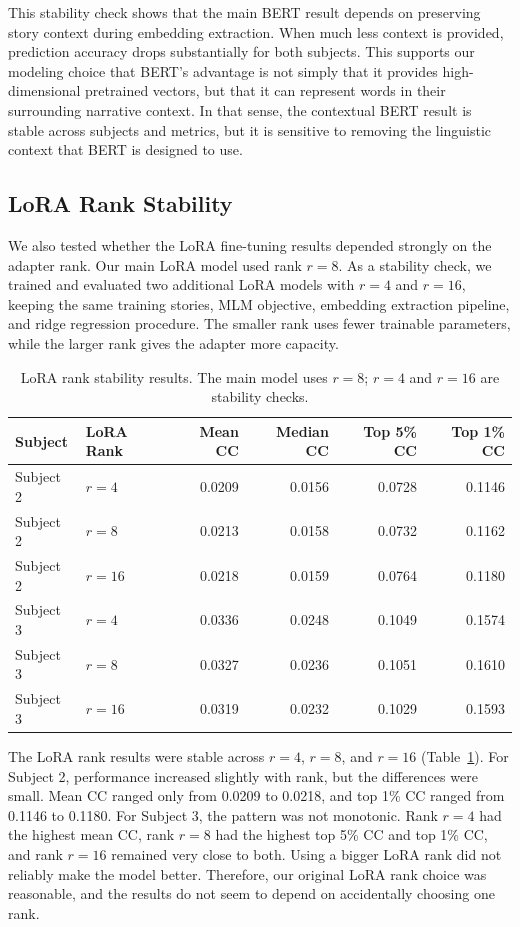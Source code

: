 \documentclass[11pt]{article}
\begin{document}
This stability check shows that the main BERT result depends on preserving story context during embedding extraction. When much less context is provided, prediction accuracy drops substantially for both subjects. This supports our modeling choice that BERT's advantage is not simply that it provides high-dimensional pretrained vectors, but that it can represent words in their surrounding narrative context. In that sense, the contextual BERT result is stable across subjects and metrics, but it is sensitive to removing the linguistic context that BERT is designed to use.

\subsection{LoRA Rank Stability}
\label{sec:stability-lora-rank}
We also tested whether the LoRA fine-tuning results depended strongly on the adapter rank. Our main LoRA model used rank \(r=8\). As a stability check, we trained and evaluated two additional LoRA models with \(r=4\) and \(r=16\), keeping the same training stories, MLM objective, embedding extraction pipeline, and ridge regression procedure. The smaller rank uses fewer trainable parameters, while the larger rank gives the adapter more capacity.

\begin{table}[H]
\centering
\begin{tabular}{llrrrr}
\toprule
Subject & LoRA Rank & Mean CC & Median CC & Top 5\% CC & Top 1\% CC \\
\midrule
Subject 2 & \(r=4\) & 0.0209 & 0.0156 & 0.0728 & 0.1146 \\
Subject 2 & \(r=8\) & 0.0213 & 0.0158 & 0.0732 & 0.1162 \\
Subject 2 & \(r=16\) & 0.0218 & 0.0159 & 0.0764 & 0.1180 \\
\midrule
Subject 3 & \(r=4\) & 0.0336 & 0.0248 & 0.1049 & 0.1574 \\
Subject 3 & \(r=8\) & 0.0327 & 0.0236 & 0.1051 & 0.1610 \\
Subject 3 & \(r=16\) & 0.0319 & 0.0232 & 0.1029 & 0.1593 \\
\bottomrule
\end{tabular}
\caption{LoRA rank stability results. The main model uses \(r=8\); \(r=4\) and \(r=16\) are stability checks.}
\label{tab:lora-rank-stability}
\end{table}

The LoRA rank results were stable across \(r=4\), \(r=8\), and \(r=16\) (Table~\ref{tab:lora-rank-stability}). For Subject 2, performance increased slightly with rank, but the differences were small. Mean CC ranged only from 0.0209 to 0.0218, and top 1\% CC ranged from 0.1146 to 0.1180. For Subject 3, the pattern was not monotonic. Rank \(r=4\) had the highest mean CC, rank \(r=8\) had the highest top 5\% CC and top 1\% CC, and rank \(r=16\) remained very close to both. Using a bigger LoRA rank did not reliably make the model better. Therefore, our original LoRA rank choice was reasonable, and the results do not seem to depend on accidentally choosing one rank.
\end{document}
